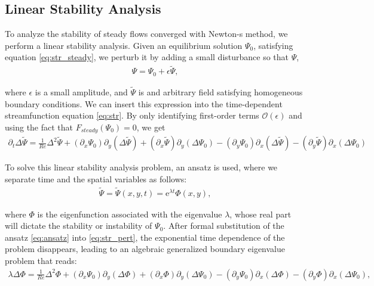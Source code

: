 \subsection{Linear Stability Analysis}

To analyze the stability of steady flows converged with Newton-s method, we
perform a linear stability analysis. Given an equilibrium solution $\Psi_0$,
satisfying equation \eqref{eq:str_steady}, we perturb it by adding a small
disturbance so that
$\Psi$,
\begin{align}
\Psi = \Psi_0 + \epsilon \tilde{\Psi},
\end{align}

where $\epsilon$ is a small amplitude, and $\tilde{\Psi}$ is and arbitrary
field satisfying homogeneous boundary conditions. We can insert this expression
into the time-dependent streamfunction equation \eqref{eq:str}. By only
identifying first-order terms $\mathcal{O}(\epsilon)$ and using the fact that
$F_{steady}(\Psi_0) = 0$, we get
\begin{align}
\partial_t \Delta \tilde{\Psi} = \frac{1}{Re} \Delta^2 \tilde{\Psi}
  + (\partial_x \Psi_0) \partial_y (\Delta \tilde{\Psi})
  + (\partial_x \tilde{\Psi}) \partial_y (\Delta \Psi_0)
  - (\partial_y \Psi_0) \partial_x (\Delta \tilde{\Psi})
  - (\partial_y \tilde{\Psi}) \partial_x (\Delta \Psi_0)
\label{eq:str_pert}
\end{align}

To solve this linear stability analysis problem, an ansatz is used, where we
separate time and the spatial variables as follows: 
\begin{align}
  \tilde{\Psi} = \tilde{\Psi}(x,y,t) = \mathrm{e}^{\lambda t} \Phi(x,y),
  \label{eq:ansatz}
\end{align}

where $\Phi$ is the eigenfunction associated with the eigenvalue $\lambda$,
whose real part will dictate the stability or instability of $\Psi_0$. After
formal substitution of the ansatz \eqref{eq:ansatz} into \eqref{eq:str_pert},
the exponential time dependence of the problem disappears, leading to an
algebraic generalized boundary eigenvalue problem that reads:
\begin{align}
\lambda \Delta \Phi = \frac{1}{Re} \Delta^2 \Phi
  + (\partial_x \Psi_0) \partial_y (\Delta \Phi)
  + (\partial_x \Phi) \partial_y (\Delta \Psi_0)
  - (\partial_y \Psi_0) \partial_x (\Delta \Phi)
  - (\partial_y \Phi) \partial_x (\Delta \Psi_0),
\label{eq:str_phi}
\end{align}

